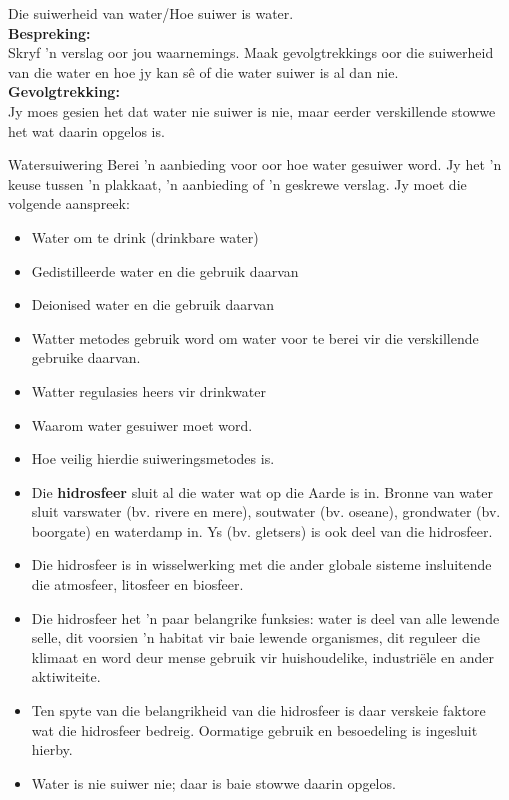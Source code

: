 \begin{g_experiment}{Die suiwerheid van water/Hoe suiwer is water.}
\\
\label{m38138*id3429827}\noindent{}\textbf{Bespreking:}\\
Skryf   'n verslag oor jou waarnemings. Maak gevolgtrekkings oor die suiwerheid van die water en hoe jy kan sê of die water suiwer is al dan nie.
\\  
\label{m38138*id68921}\noindent{}\textbf{Gevolgtrekking:}\\
Jy moes gesien het dat water nie suiwer is nie, maar eerder verskillende stowwe het wat daarin opgelos is.
\\
\end{g_experiment}
\label{m38138*id672214}
            \begin{project}{Watersuiwering}
            \nopagebreak
\label{m38138*id97324}
Berei   'n aanbieding voor oor hoe water gesuiwer word. Jy het   'n keuse tussen   'n plakkaat,   'n aanbieding of   'n geskrewe verslag. Jy moet die volgende aanspreek:
\label{m38138*id097324}\begin{itemize}[noitemsep]
            \item Water om te drink (drinkbare water)
\item Gedistilleerde water en die gebruik daarvan
\item Deionised water en die gebruik daarvan
\item Watter metodes gebruik word om water voor te berei vir die verskillende gebruike daarvan.
\item Watter regulasies heers vir drinkwater
\item Waarom water gesuiwer moet word.
\item Hoe veilig hierdie suiweringsmetodes is.
\end{itemize}
\par 
\end{project}


            \nopagebreak

\begin{itemize}[noitemsep]
\item Die \textbf{hidrosfeer} sluit al die water wat op die Aarde is in. Bronne van water sluit varswater (bv. rivere en mere), soutwater (bv. oseane), grondwater (bv. boorgate) en waterdamp in. Ys (bv. gletsers)  is ook deel van die hidrosfeer.
\label{m38138*uid93}\item Die hidrosfeer is in wisselwerking met die ander globale sisteme insluitende die atmosfeer, litosfeer en biosfeer.
\label{m38138*uid94}\item Die hidrosfeer het   'n paar belangrike funksies: water is deel van alle lewende selle, dit voorsien   'n habitat vir baie lewende organismes, dit reguleer die klimaat  en word deur mense gebruik  vir huishoudelike, industriële en ander aktiwiteite.
\label{m38138*uid106}\item Ten spyte van die belangrikheid van die hidrosfeer is daar verskeie faktore wat die hidrosfeer bedreig. Oormatige gebruik en besoedeling is ingesluit hierby.
\item Water is nie suiwer nie; daar is baie stowwe daarin opgelos.
\end{itemize}

